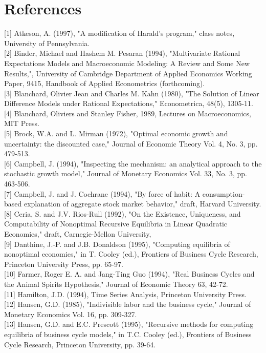 \documentclass[10pt]{article}
\begin{document}
\section*{References}
[1] Atkeson, A. (1997), "A modification of Harald's program," class notes, University of Pennsylvania.\\[0pt]
[2] Binder, Michael and Hashem M. Pesaran (1994), "Multivariate Rational Expectations Models and Macroeconomic Modeling: A Review and Some New Results,", University of Cambridge Department of Applied Economics Working Paper, 9415, Handbook of Applied Econometrics (forthcoming).\\[0pt]
[3] Blanchard, Olivier Jean and Charles M. Kahn (1980), "The Solution of Linear Difference Models under Rational Expectations," Econometrica, 48(5), 1305-11.\\[0pt]
[4] Blanchard, Oliviers and Stanley Fisher, 1989, Lectures on Macroeconomics, MIT Press.\\[0pt]
[5] Brock, W.A. and L. Mirman (1972), "Optimal economic growth and uncertainty: the discounted case," Journal of Economic Theory Vol. 4, No. 3, pp. 479-513.\\[0pt]
[6] Campbell, J. (1994), "Inspecting the mechanism: an analytical approach to the stochastic growth model," Journal of Monetary Economics Vol. 33, No. 3, pp. 463-506.\\[0pt]
[7] Campbell, J. and J. Cochrane (1994), "By force of habit: A consumption-based explanation of aggregate stock market behavior," draft, Harvard University.\\[0pt]
[8] Ceria, S. and J.V. Rios-Rull (1992), "On the Existence, Uniqueness, and Computability of Nonoptimal Recursive Equilibria in Linear Quadratic Economies," draft, Carnegie-Mellon University,\\[0pt]
[9] Danthine, J.-P. and J.B. Donaldson (1995), "Computing equilibria of nonoptimal economics," in T. Cooley (ed.), Frontiers of Business Cycle Research, Princeton University Press, pp. 65-97.\\[0pt]
[10] Farmer, Roger E. A. and Jang-Ting Guo (1994), "Real Business Cycles and the Animal Spirits Hypothesis," Journal of Economic Theory 63, 42-72.\\[0pt]
[11] Hamilton, J.D. (1994), Time Series Analysis, Princeton University Press.\\[0pt]
[12] Hansen, G.D. (1985), "Indivisible labor and the business cycle," Journal of Monetary Economics Vol. 16, pp. 309-327.\\[0pt]
[13] Hansen, G.D. and E.C. Prescott (1995), "Recursive methods for computing equilibria of business cycle models," in T.C. Cooley (ed.), Frontiers of Business Cycle Research, Princeton University, pp. 39-64.\\[0pt]
\end{document}

